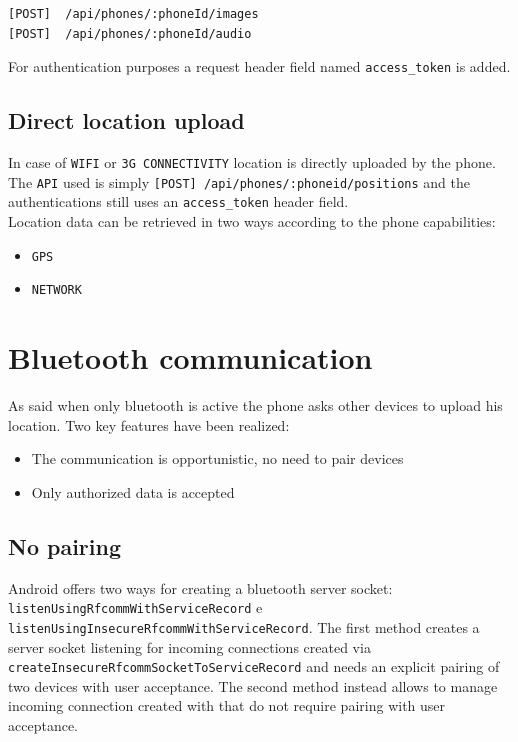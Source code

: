 \documentclass[conference]{IEEEtran}
\begin{document}
\begin{lstlisting}[caption=REST API to upload images and audio]
[POST]	/api/phones/:phoneId/images
[POST] 	/api/phones/:phoneId/audio
\end{lstlisting}

For authentication purposes a request header field named \texttt{access\_token} is added.

\subsection{\textbf{Direct location upload}}
In case of \texttt{WIFI} or \texttt{3G CONNECTIVITY} location is directly uploaded by the phone. The \texttt{API} used is simply \texttt{[POST] /api/phones/:phoneid/positions} and the authentications still uses an \texttt{access\_token} header field.\\
Location data can be retrieved in two ways according to the phone capabilities:\\

\begin{itemize}
	\item \texttt{GPS}
	\item \texttt{NETWORK}
\end{itemize}

\section{\textbf{Bluetooth communication}}
As said when only bluetooth is active the phone asks other devices to upload his location. Two key features have been realized:\\

\begin{itemize}
	\item The communication is opportunistic, no need to pair devices
	\item Only authorized data is accepted\\
\end{itemize}

\subsection{\textbf{No pairing}}
Android offers two ways for creating a bluetooth server socket: \texttt{listenUsingRfcommWithServiceRecord} e \texttt{listenUsingInsecureRfcommWithServiceRecord}. The first method creates a server socket listening for incoming connections created via \texttt{createInsecureRfcommSocketToServiceRecord} and needs an explicit pairing of two devices with user acceptance. The second method instead allows to manage incoming connection created with \texttt{} that do not require pairing with user acceptance.\\
\end{document}
